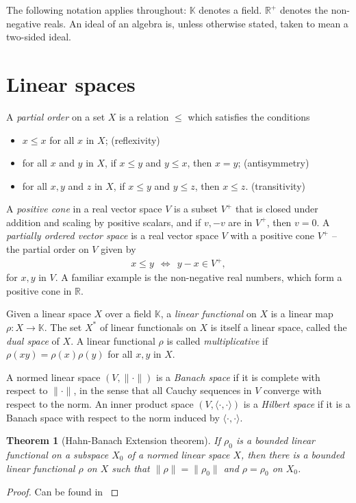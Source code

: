 \documentclass[12pt,a4paper]{report}
\theoremstyle{plain}
\newtheorem*{thm*}{Theorem}
\theoremstyle{definition}
\newcommand{\1}{\mathbbm{1}}
\newcommand{\R}{\mathbb{R}}
\begin{document}
	
	
The following notation applies throughout:
$\mathbb{K}$ denotes a field. $\R^+$ denotes the non-negative reals. An ideal of an algebra is, unless 
otherwise stated, taken to mean a two-sided ideal. 

\section{Linear spaces}

A \emph{partial order} on a set $X$ is a relation $\leq$ which satisfies the conditions
\begin{itemize}
	\item $x \leq x$ for all $x$ in $X$; 		\hfill (reflexivity)
	\item for all $x$ and $y$ in $X$, if $x \leq y$ and $y\leq x$, then $x=y$; 
												\hfill (antisymmetry)
	\item for all $x,y$ and $z$ in $X$, if $x \leq y$ and $y\leq z$, then $x\leq z$. 
												\hfill (transitivity)
\end{itemize}

A \emph{positive cone} in a real vector space $V$ is a subset $V^+$ that is closed under addition and scaling by positive scalars, and if $v,-v$ are in $V^+$, then $v=0$. A \emph{partially ordered vector space} is a real vector space $V$ with a positive cone $V^+$ -- the partial order on $V$ given by
\begin{align*}
	x\leq y ~~\iff~~ y-x \in V^+,
\end{align*}
for $x,y$ in $V$.
A familiar example is the non-negative real numbers, which form a positive cone in $\R$.


Given a linear space $X$ over a field $\mathbb K$, a \emph{linear functional} on $X$ is a linear map 
$\rho:X\to\mathbb K$. The set $X^\ast$ of linear functionals on $X$ is itself a linear space, called
the \emph{dual space} of $X$. A linear functional $\rho$ is called \emph{multiplicative} if $\rho(xy) = \rho(x)\rho(y)$ for all $x,y$ in $X$.

A normed linear space $(V,\|\cdot\|)$ is a \emph{Banach space} if it is complete with respect to 
$\|\cdot\|$, in the sense that all Cauchy sequences in $V$ converge with respect to the norm. An inner 
product space $(V,\langle\cdot,\cdot\rangle)$ is a \emph{Hilbert space} if it is a Banach space with 
respect to the norm induced by $\langle\cdot,\cdot\rangle$.

\begin{thm*}[Hahn-Banach Extension theorem] 
	If $\rho_0$ is a bounded linear functional on a subspace $X_0$ of a normed linear space $X$,
	then there is a bounded linear functional $\rho$ on $X$ such that $\|\rho\|=\|\rho_0\|$ and 
	$\rho=\rho_0$ on $X_0$.
\end{thm*}
\begin{proof}
	Can be found in \cite[Theorem 1.6.1, p.~44]{kadison83}
\end{proof}
\end{document}
